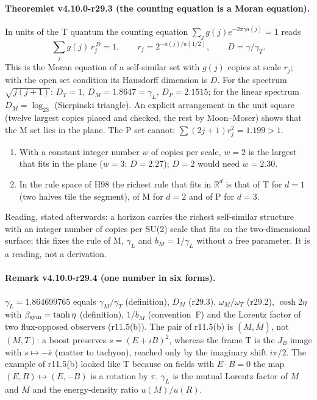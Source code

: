 \paragraph{Theoremlet v4.10.0-r29.3 (the counting equation is a Moran equation).}
In units of the T quantum the counting equation \(\sum_jg(j)e^{-2\pi\gamma a(j)}=1\) reads
\[
\sum_j g(j)\,r_j^{\,D}=1,\qquad r_j=2^{-a(j)/a(1/2)},\qquad D=\gamma/\gamma_T .
\]
This is the Moran equation of a self-similar set with \(g(j)\) copies at scale \(r_j\); with the open set condition its Hausdorff dimension is
\(D\).  For the spectrum \(\sqrt{j(j+1)}\): \(D_T=1\), \(D_M=1.8647=\gamma_L\), \(D_P=2.1515\); for the linear spectrum \(D_M=\log_23\) (Sierpinski
triangle).  An explicit arrangement in the unit square (twelve largest copies placed and checked, the rest by Moon--Moser) shows that the M set lies in
the plane.  The P set cannot: \(\sum(2j+1)r_j^2=1.199>1\).
\begin{enumerate}[leftmargin=2em]
\item[(a)] With a constant integer number \(w\) of copies per scale, \(w=2\) is the largest that fits in the plane (\(w=3\): \(D=2.27\)); \(D=2\) would
need \(w=2.30\).
\item[(b)] In the rule space of H98 the richest rule that fits in \(\mathbb R^d\) is that of T for \(d=1\) (two halves tile the segment), of M for
\(d=2\) and of P for \(d=3\).
\end{enumerate}
Reading, stated afterwards: a horizon carries the richest self-similar structure with an integer number of copies per SU(2) scale that fits on the
two-dimensional surface; this fixes the rule of M, \(\gamma_L\) and \(b_M=1/\gamma_L\) without a free parameter.  It is a reading, not a derivation.

\paragraph{Remark v4.10.0-r29.4 (one number in six forms).}
\(\gamma_L=1.864699765\) equals \(\gamma_M/\gamma_T\) (definition), \(D_M\) (r29.3), \(\omega_M/\omega_T\) (r29.2), \(\cosh2\eta\) with
\(\beta_{\rm sym}=\tanh\eta\) (definition), \(1/b_M\) (convention~F) and the Lorentz factor of two flux-opposed observers (r11.5(b)).  The pair of
r11.5(b) is \((M,\bar M)\), not \((M,T)\): a boost preserves \(s=(E+iB)^2\), whereas the frame T is the \(J_B\) image with \(s\mapsto-\bar s\) (matter to
tachyon), reached only by the imaginary shift \(i\pi/2\).  The example of r11.5(b) looked like T because on fields with \(E\cdot B=0\) the map
\((E,B)\mapsto(E,-B)\) is a rotation by \(\pi\).  \(\gamma_L\) is the mutual Lorentz factor of \(M\) and \(\bar M\) and the energy-density ratio
\(u(M)/u(R)\).

